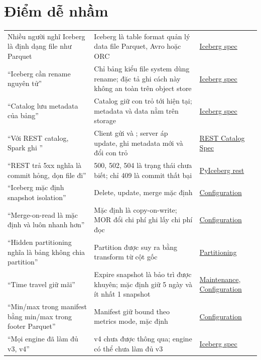 \section{Điểm dễ nhầm}
\begin{xltabular}{\textwidth}{@{}P{4.2cm} L P{3.2cm}@{}}
\toprule
{} &  &  \\
\midrule
\endhead
\bottomrule
\endfoot
Nhiều người nghĩ Iceberg là định dạng file như Parquet & Iceberg là table format quản lý data file Parquet, Avro hoặc ORC & \href{https://iceberg.apache.org/spec/}{Iceberg spec} \\
``Iceberg cần rename nguyên tử'' & Chỉ bảng kiểu file system dùng rename; đặc tả ghi cách này không an toàn trên object store & \href{https://iceberg.apache.org/spec/}{Iceberg spec} \\
``Catalog lưu metadata của bảng'' & Catalog giữ con trỏ tới  hiện tại; metadata và data nằm trên storage & \href{https://iceberg.apache.org/spec/}{Iceberg spec} \\
``Với REST catalog, Spark ghi '' & Client gửi  và ; server áp update, ghi metadata mới và đổi con trỏ & \href{https://iceberg.apache.org/rest-catalog-spec/}{REST Catalog Spec} \\
``REST trả 5xx nghĩa là commit hỏng, dọn file đi'' & 500, 502, 504 là trạng thái chưa biết; chỉ 409 là commit thất bại & \href{https://py.iceberg.apache.org/reference/pyiceberg/catalog/rest/}{PyIceberg rest} \\
``Iceberg mặc định snapshot isolation'' & Delete, update, merge mặc định  & \href{https://iceberg.apache.org/docs/latest/configuration/}{Configuration} \\
``Merge-on-read là mặc định và luôn nhanh hơn'' & Mặc định là copy-on-write; MOR đổi chi phí ghi lấy chi phí đọc & \href{https://iceberg.apache.org/docs/latest/configuration/}{Configuration} \\
``Hidden partitioning nghĩa là bảng không chia partition'' & Partition được suy ra bằng transform từ cột gốc & \href{https://iceberg.apache.org/docs/latest/partitioning/}{Partitioning} \\
``Time travel giữ mãi'' & Expire snapshot là bảo trì được khuyên; mặc định giữ 5 ngày và ít nhất 1 snapshot & \href{https://iceberg.apache.org/docs/latest/maintenance/}{Maintenance}, \href{https://iceberg.apache.org/docs/latest/configuration/}{Configuration} \\
``Min/max trong manifest bằng min/max trong footer Parquet'' & Manifest giữ bound theo metrics mode, mặc định  & \href{https://iceberg.apache.org/docs/latest/configuration/}{Configuration} \\
``Mọi engine đã làm đủ v3, v4'' & v4 chưa được thông qua; engine có thể chưa làm đủ v3 & \href{https://iceberg.apache.org/spec/}{Iceberg spec} \\
\end{xltabular}
